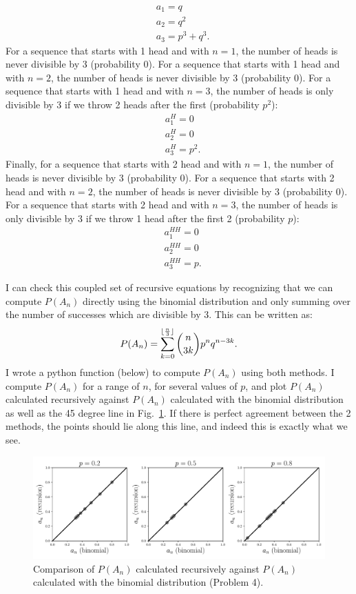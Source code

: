 \begin{problem}{4}
\begin{align*}
&a_1 = q\\
&a_2=q^2\\
&a_3=p^3+q^3.
\end{align*}
For a sequence that starts with 1 head and with $n=1$, the number of heads is never divisible by 3 (probability $0$).   For a sequence that starts with 1 head and with $n=2$, the number of heads is never divisible by 3 (probability $0$).  For a sequence that starts with 1 head and with $n=3$, the number of heads is only divisible by 3 if we throw 2 heads after the first (probability $p^2$):
\begin{align*}
&a_1^H = 0\\
&a_2^H=0\\
&a_3^H=p^2.
\end{align*}
Finally, for a sequence that starts with 2 head and with $n=1$, the number of heads is never divisible by 3 (probability $0$).   For a sequence that starts with 2 head and with $n=2$, the number of heads is never divisible by 3 (probability $0$).  For a sequence that starts with 2 head and with $n=3$, the number of heads is only divisible by 3 if we throw 1 head after the first 2 (probability $p$):
\begin{align*}
&a_1^{HH} = 0\\
&a_2^{HH}=0\\
&a_3^{HH}=p.
\end{align*}

I can check this coupled set of recursive equations by recognizing that we can compute $P(A_n)$ directly using the binomial distribution and only summing over the number of successes which are divisible by 3.  This can be written as:
\begin{equation*}
P(A_n) =\sum_{k=0}^{\lfloor\frac{n}{3}\rfloor }\binom{n}{3k} p^nq^{n-3k}.
\end{equation*}
I wrote a python function (below) to compute $P(A_n)$ using both methods.  I compute $P(A_n)$ for a range of $n$, for several values of $p$, and plot $P(A_n)$ calculated recursively against  $P(A_n)$ calculated with the binomial distribution as well as the 45 degree line in Fig.~\ref{fig:prob_4}.  If there is perfect agreement between the 2 methods, the points should lie along this line, and indeed this is exactly what we see.

	\begin{figure}[t]
	\centering
      		 \includegraphics[totalheight=6cm]{chpt13/prob4.pdf}
  			  \caption{Comparison of $P(A_n)$ calculated recursively against $P(A_n)$ calculated with the binomial distribution (Problem 4).}
    			   \label{fig:prob_4}
	\end{figure}


\end{problem}

